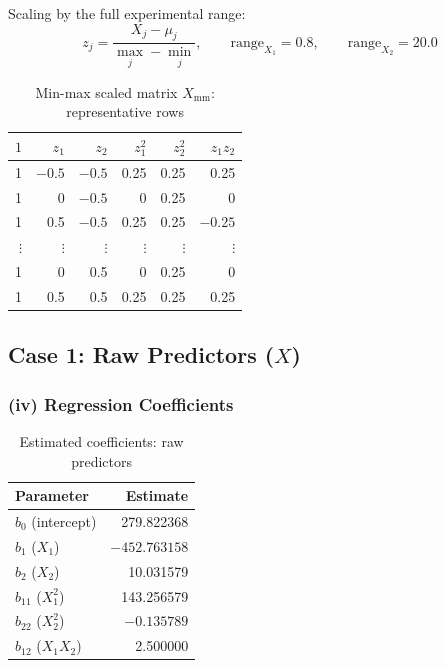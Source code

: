 \documentclass[12pt,a4paper]{article}
\begin{document}
Scaling by the full experimental range:
\[
  z_j = \frac{X_j - \mu_j}{\max_j - \min_j}, \qquad
  \text{range}_{X_1} = 0.8, \qquad \text{range}_{X_2} = 20.0
\]

\begin{table}[H]
\centering
\caption{Min-max scaled matrix $X_{\text{mm}}$: representative rows}
\begin{tabular}{rrrrrr}
\toprule
$1$ & $z_1$ & $z_2$ & $z_1^2$ & $z_2^2$ & $z_1 z_2$ \\
\midrule
1 & $-0.5$ & $-0.5$ & 0.25 & 0.25 &  0.25 \\
1 &  0     & $-0.5$ & 0    & 0.25 &  0    \\
1 &  0.5   & $-0.5$ & 0.25 & 0.25 & $-0.25$ \\
$\vdots$ & $\vdots$ & $\vdots$ & $\vdots$ & $\vdots$ & $\vdots$ \\
1 &  0     &  0.5   & 0    & 0.25 &  0    \\
1 &  0.5   &  0.5   & 0.25 & 0.25 &  0.25 \\
\bottomrule
\end{tabular}
\end{table}

\subsection{Case 1: Raw Predictors ($X$)}

\subsubsection{(iv) Regression Coefficients}

\begin{table}[H]
\centering
\caption{Estimated coefficients: raw predictors}
\begin{tabular}{lr}
\toprule
Parameter & Estimate \\
\midrule
$b_0$ (intercept)     &  279.822368 \\
$b_1$ ($X_1$)         & $-452.763158$ \\
$b_2$ ($X_2$)         &   10.031579 \\
$b_{11}$ ($X_1^2$)    &  143.256579 \\
$b_{22}$ ($X_2^2$)    &   $-0.135789$ \\
$b_{12}$ ($X_1 X_2$)  &    2.500000 \\
\bottomrule
\end{tabular}
\end{table}
\end{document}
